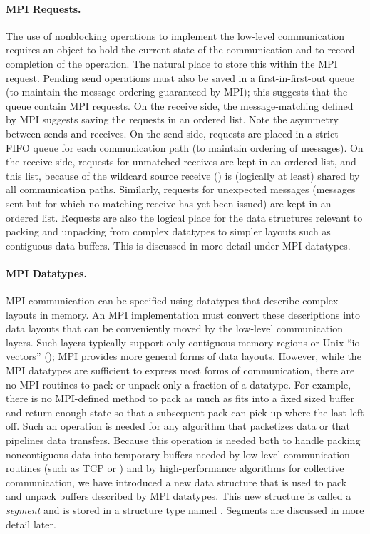 \paragraph{MPI Requests.}
The use of nonblocking operations to implement the low-level
communication requires an object to hold the current state of the
communication and to record completion of the operation.  The natural
place to store this within the MPI request.  Pending send operations must
also be saved in a first-in-first-out queue (to maintain the message
ordering guaranteed by MPI); this suggests that the queue contain MPI
requests.  On the receive side, the message-matching defined by MPI
suggests saving the requests in an ordered list.  Note the asymmetry
between sends and receives.  On the send side, requests are placed in
a strict FIFO queue for each communication path (to maintain ordering
of messages).  On the receive side, requests for unmatched receives
are kept in an ordered 
list, and this list, because of the wildcard source receive
() is (logically at least) shared by all
communication paths.  Similarly, requests for unexpected messages
(messages sent but for which no matching receive has yet been issued)
are kept in an ordered list.
Requests are also the logical place for the data structures relevant to packing and
unpacking from complex datatypes to simpler layouts such as contiguous
data buffers.  This is discussed in more detail under MPI datatypes.

\paragraph{MPI Datatypes.}
MPI communication can be specified using datatypes that describe
complex layouts in memory.  An MPI implementation must convert these
descriptions into data layouts that can be conveniently moved by the
low-level communication layers.  Such layers typically support only
contiguous memory regions or Unix ``io vectors'' (); MPI provides more general forms of data layouts.  However,
while the MPI datatypes are sufficient to express most forms of
communication, there are no MPI routines to pack or unpack only a
fraction of a datatype.  For example, there is no MPI-defined method
to pack as much as fits into a fixed sized buffer and return enough
state so that a subsequent pack can pick up where the last left off.
Such an operation is needed for any algorithm that packetizes data or
that pipelines data transfers.  Because this operation is needed both
to handle packing noncontiguous data into temporary buffers needed by
low-level communication routines (such as TCP  or
) and by high-performance algorithms for collective
communication, we have introduced a new data structure that is used to
pack and unpack buffers described by MPI datatypes.  This new
structure is called a \emph{segment} and is stored in a structure
type named .  Segments are discussed in more
detail later. 

